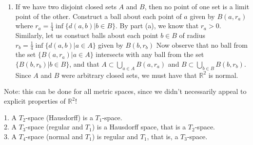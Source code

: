 \documentclass[a4paper,12pt,twoside]{hmcpset}
\begin{document}
\begin{solution}
\begin{enumerate}
        \item     If we have two disjoint closed sets $A$ and $B$, then no point of
        one set is a limit point of the other. Construct a ball about each
        point of $a$ given by $B(a, r_a)$ where $r_a =
        \frac{1}{4}\inf\{d(a, b) | b \in B\}$. By part (a), we know that
        $r_a > 0$. Similarly, let us constuct balls about each point $b
        \in B$ of radius $r_b = \frac{1}{4}\inf\{d(a, b) | a \in A\}$
        given by $B(b, r_b)$ Now observe that no ball from the set $\{B(a,
        r_a)| a \in A\}$ intersects with any ball from the set $\{B(b,
        r_b)| b \in B\}$, and that $A \subset \bigcup\limits_{a \in A}B(a,
        r_a)$ and $B \subset \bigcup\limits_{b \in B}B(b, r _b)$. Since
        $A$ and $B$ were arbitrary closed sets, we must have that
        $\mathbb{R}^2$ is normal.
    \end{enumerate}
\end{solution}
Note: this can be done for all metric spaces, since we didn't
necessarily appeal to explicit properties of $\mathbb{R}^2$!


\begin{problem}[Theorem 5.7] 1. A $T_2$-space (Hausdorff) is a
$T_1$-space.\\
2. A $T_3$-space (regular and $T_1$) is a Hausdorff space, that is a
$T_2$-space.\\
3. A $T_4$-space (normal and $T_1$) is regular and $T_1$, that is, a
$T_3$-space.
\end{problem}
\end{document}
